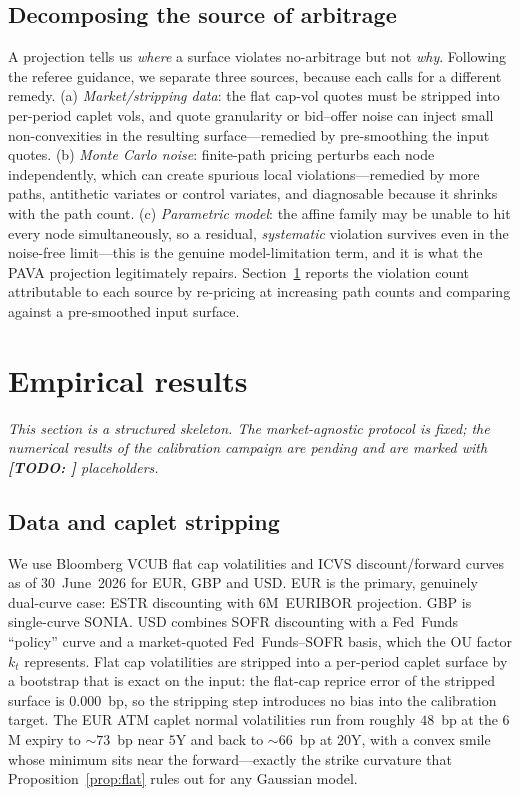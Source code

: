 \documentclass[11pt]{article}
\newcommand{\TODO}[1]{\textbf{[TODO: #1]}}
\theoremstyle{plain}
\theoremstyle{definition}
\begin{document}
\subsection{Decomposing the source of arbitrage}
\label{sec:arbsrc}

A projection tells us \emph{where} a surface violates no-arbitrage but not
\emph{why}. Following the referee guidance, we separate three sources, because
each calls for a different remedy. (a) \emph{Market/stripping data}: the flat
cap-vol quotes must be stripped into per-period caplet vols, and quote
granularity or bid--offer noise can inject small non-convexities in the
resulting surface---remedied by pre-smoothing the input quotes. (b) \emph{Monte
Carlo noise}: finite-path pricing perturbs each node independently, which can
create spurious local violations---remedied by more paths, antithetic variates or
control variates, and diagnosable because it shrinks with the path count. (c)
\emph{Parametric model}: the affine family may be unable to hit every node
simultaneously, so a residual, \emph{systematic} violation survives even in the
noise-free limit---this is the genuine model-limitation term, and it is what the
PAVA projection legitimately repairs. Section~\ref{sec:results} reports the
violation count attributable to each source by re-pricing at increasing path
counts and comparing against a pre-smoothed input surface.

\section{Empirical results}
\label{sec:results}

\emph{This section is a structured skeleton. The market-agnostic protocol is
fixed; the numerical results of the calibration campaign are pending and are
marked with \TODO{} placeholders.}

\subsection{Data and caplet stripping}

We use Bloomberg VCUB flat cap volatilities and ICVS discount/forward curves as
of 30~June~2026 for EUR, GBP and USD. EUR is the primary, genuinely dual-curve
case: ESTR discounting with 6M~EURIBOR projection. GBP is single-curve SONIA.
USD combines SOFR discounting with a Fed~Funds ``policy'' curve and a
market-quoted Fed~Funds--SOFR basis, which the OU factor $k_t$ represents. Flat
cap volatilities are stripped into a per-period caplet surface by a bootstrap
that is exact on the input: the flat-cap reprice error of the stripped surface is
$0.000$~bp, so the stripping step introduces no bias into the calibration target.
The EUR ATM caplet normal volatilities run from roughly $48$~bp at the $6$M
expiry to $\sim 73$~bp near $5$Y and back to $\sim 66$~bp at $20$Y, with a convex
smile whose minimum sits near the forward---exactly the strike curvature that
Proposition~\ref{prop:flat} rules out for any Gaussian model.
\end{document}
